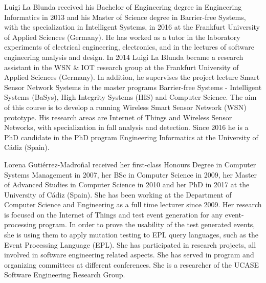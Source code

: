 \documentclass[10pt,journal,compsoc]{IEEEtran}
\begin{document}
\begin{IEEEbiography}{Luigi La Blunda}
 received his Bachelor of Engineering degree in Engineering Informatics in 2013 and his Master of Science degree in Barrier-free Systems, with the specialization in Intelligent Systems, in 2016 at the Frankfurt University of Applied Sciences (Germany). He has worked as a tutor in the laboratory experiments of electrical engineering, electronics, and in the lectures of software engineering analysis and design. In 2014 Luigi La Blunda became a research assistant in the WSN \& IOT research group at the Frankfurt University of Applied Sciences (Germany). In addition, he supervises the project lecture Smart Sensor Network Systems in the master programs Barrier-free Systems - Intelligent Systems (BaSys), High Integrity Systems (HIS) and Computer Science. The aim of this course is to develop a running Wireless Smart Sensor Network (WSN) prototype.  His research areas are Internet of Things and Wireless Sensor Networks, with specialization in fall analysis and detection. Since 2016 he is a PhD candidate in the PhD program Engineering Informatics at the University of C\'adiz (Spain).
\end{IEEEbiography}
\vfill
\begin{IEEEbiography}{Lorena Guti\'errez-Madro\~nal}
	received her first-class Honours Degree in Computer Systems Management in 2007, her BSc in Computer Science in 2009, her Master of Advanced Studies in Computer Science in 2010 and her PhD in 2017 at the University of C\'adiz (Spain). She has been working at the Department of Computer Science and Engineering as a full time lecturer since 2009. Her research is focused on the Internet of Things and test event generation for any event-processing program. In order to prove the usability of the test generated events, she is using them to apply mutation testing to EPL query languages, such as the Event Processing Language (EPL). She has participated in research projects, all involved in software engineering related aspects. She has served in program and organizing committees at different conferences. She is a researcher of the UCASE Software Engineering Research Group. 
\end{IEEEbiography}
\end{document}
